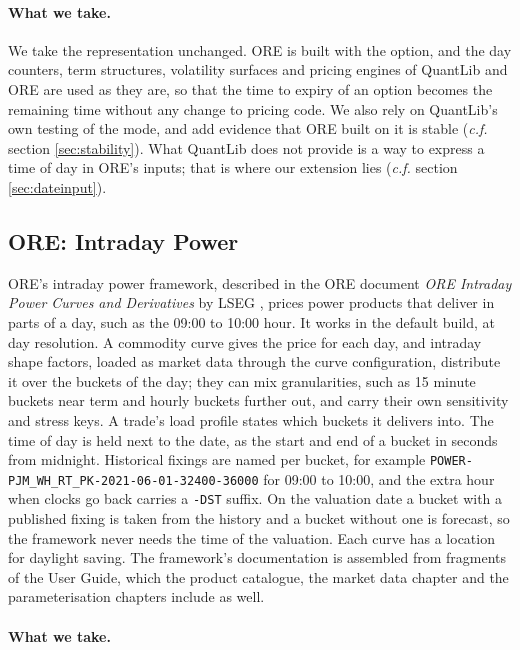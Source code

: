 \documentclass[12pt, a4paper]{article}
\begin{document}
\paragraph*{What we take.} We take the representation unchanged. ORE is built with the option, and the day counters, term
structures, volatility surfaces and pricing engines of QuantLib and ORE are used as they are, so that the time to
expiry of an option becomes the remaining time without any change to pricing code. We also rely on QuantLib's own
testing of the mode, and add evidence that ORE built on it is stable (\textit{c.f.} section \ref{sec:stability}). What QuantLib does
not provide is a way to express a time of day in ORE's inputs; that is where our extension lies (\textit{c.f.} section
\ref{sec:dateinput}).

\subsection{ORE: Intraday Power}\label{sec:intradaypower}

ORE's intraday power framework, described in the ORE document \textit{ORE Intraday Power Curves and Derivatives}
by LSEG \cite{intradaypower}, prices power products that deliver in parts of a day, such as the 09:00 to 10:00
hour. It works in the default build, at day resolution. A commodity curve gives the price for each day, and intraday
shape factors, loaded as market data through the curve configuration, distribute it over the buckets of the day; they
can mix granularities, such as 15 minute buckets near term and hourly buckets further out, and carry their own
sensitivity and stress keys. A trade's load profile states which buckets it delivers into. The time of day is held
next to the date, as the start and end of a bucket in seconds from midnight. Historical fixings are named per bucket,
for example \texttt{POWER-PJM\_WH\_RT\_PK-2021-06-01-32400-36000} for 09:00 to 10:00, and the extra hour when clocks go
back carries a \texttt{-DST} suffix. On the valuation date a bucket with a published fixing is taken from the history
and a bucket without one is forecast, so the framework never needs the time of the valuation. Each curve has a
location for daylight saving. The framework's documentation is assembled from fragments of the User Guide, which the
product catalogue, the market data chapter and the parameterisation chapters include as well.

\paragraph*{What we take.}
\end{document}
